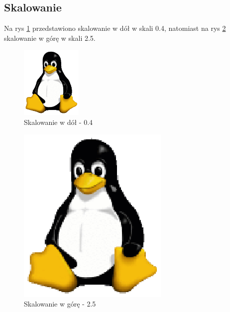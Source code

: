 \documentclass[12pt, a4paper]{article}
\begin{document}
\subsection{Skalowanie}
Na rys \ref{fig:down} przedstawiono skalowanie w dół w skali 0.4, natomiast na rys \ref{fig:up} skalowanie w górę w skali 2.5.

\begin{figure}[p]
\includegraphics{scale_down}
\caption{Skalowanie w dół - 0.4}
\label{fig:down}
\end{figure}

\begin{figure}[p]
\includegraphics{scale_up}
\caption{Skalowanie w górę - 2.5}
\label{fig:up}
\end{figure}
\end{document}

